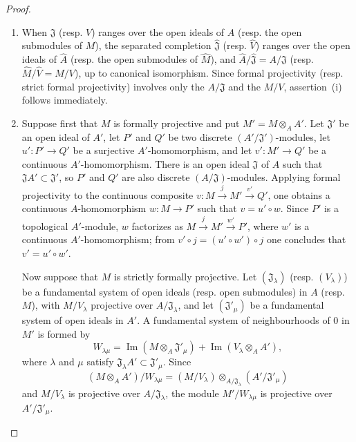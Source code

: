 \begin{proof}
\begin{enumerate}
  \item[(i)] When $\mathfrak J$ (resp. $V$) ranges over the open ideals of $A$ (resp. the open submodules of $M$), the separated completion $\widehat{\mathfrak J}$ (resp. $\widehat V$) ranges over the open ideals of $\widehat A$ (resp. the open submodules of $\widehat M$), and $\widehat A/\widehat{\mathfrak J}=A/\mathfrak J$ (resp. $\widehat M/\widehat V=M/V$), up to canonical isomorphism.
  Since formal projectivity (resp. strict formal projectivity) involves only the $A/\mathfrak J$ and the $M/V$, assertion~(i) follows immediately.

  \item[(ii)] Suppose first that $M$ is formally projective and put $M'=M\otimes_A A'$.
  Let $\mathfrak J'$ be an open ideal of $A'$, let $P'$ and $Q'$ be two discrete $(A'/\mathfrak J')$-modules, let $u':P'\to Q'$ be a surjective $A'$-homomorphism, and let $v':M'\to Q'$ be a continuous $A'$-homomorphism.
  There is an open ideal $\mathfrak J$ of $A$ such that $\mathfrak JA'\subset\mathfrak J'$, so $P'$ and $Q'$ are also discrete $(A/\mathfrak J)$-modules.
  Applying formal projectivity to the continuous composite $v:M\xrightarrow{j}M'\xrightarrow{v'}Q'$, one obtains a continuous $A$-homomorphism $w:M\to P'$ such that $v=u'\circ w$.
  Since $P'$ is a topological $A'$-module, $w$ factorizes as $M\xrightarrow{j}M'\xrightarrow{w'}P'$, where $w'$ is a continuous $A'$-homomorphism; from $v'\circ j=(u'\circ w')\circ j$ one concludes that $v'=u'\circ w'$.

  Now suppose that $M$ is strictly formally projective.
  Let $(\mathfrak J_\lambda)$ (resp. $(V_\lambda)$) be a fundamental system of open ideals (resp. open submodules) in $A$ (resp. $M$), with $M/V_\lambda$ projective over $A/\mathfrak J_\lambda$, and let $(\mathfrak J'_\mu)$ be a fundamental system of open ideals in $A'$.
  A fundamental system of neighbourhoods of $0$ in $M'$ is formed by
  \[
    W_{\lambda\mu}=\operatorname{Im}(M\otimes_A\mathfrak J'_\mu)+\operatorname{Im}(V_\lambda\otimes_A A'),
  \]
  where $\lambda$ and $\mu$ satisfy $\mathfrak J_\lambda A'\subset\mathfrak J'_\mu$.
  Since
  \[
    (M\otimes_A A')/W_{\lambda\mu}=(M/V_\lambda)\otimes_{A/\mathfrak J_\lambda}(A'/\mathfrak J'_\mu)
  \]
  and $M/V_\lambda$ is projective over $A/\mathfrak J_\lambda$, the module $M'/W_{\lambda\mu}$ is projective over $A'/\mathfrak J'_\mu$.
\end{enumerate}
\end{proof}

